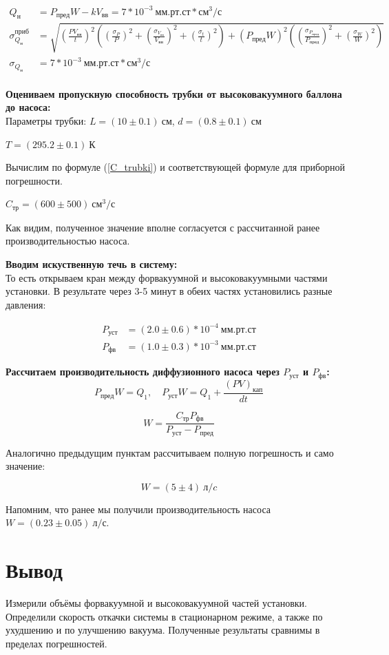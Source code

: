 \documentclass[a4paper, 12pt]{article}
\begin{document}
            \begin{align*}
                Q_н &= P_{пред} W - k V_{вв} = 7 * 10^{-3}~мм.рт.ст*см^3/с\\
                \sigma_{Q_н}^{приб} &= \sqrt{ \left( \frac{P V_{вв}}{t} \right)^2 \left( \left( \frac{\sigma_P}{P} \right)^2 + \left( \frac{\sigma_{V_{вв}}}{V_{вв}} \right)^2 + \left( \frac{\sigma_t}{t} \right)^2 \right) + \left( P_{пред} W \right)^2 \left( \left( \frac{\sigma_{P_{пред}}}{P_{пред}} \right)^2 + \left( \frac{\sigma_W}{W} \right)^2 \right)}\\
                \sigma_{Q_н} &= 7 * 10^{-3}~мм.рт.ст*см^3/с\\
            \end{align*}

        \textbf{Оцениваем пропускную способность трубки от высоковакуумного баллона до насоса:} \\
            Параметры трубки: $L = (10 \pm 0.1)~см$, $d = (0.8 \pm 0.1)~см$

            $T = (295.2 \pm 0.1)~К$

            Вычислим по формуле (\ref{C_trubki}) и соответствующей формуле для приборной погрешности.

            $C_{тр} = (600 \pm 500)~см^3/с$

            Как видим, полученное значение вполне согласуется с рассчитанной ранее производительностью насоса.

        \textbf{Вводим искуственную течь в систему:} \\

            То есть открываем кран между форвакуумной и высоковакуумными частями установки. В результате через 3-5 минут в обеих частях установились разные давления:

            \begin{align*}
                P_{уст} &= (2.0 \pm 0.6)*10^{-4}~мм.рт.ст\\
                P_{фв} &= (1.0 \pm 0.3)*10^{-3}~мм.рт.ст
            \end{align*}

        \textbf{Рассчитаем производительность диффузионного насоса через $P_{уст}$ и $P_{фв}$:} \\
		    $$P_{пред}W = Q_1, \quad P_{уст}W = Q_1 + \frac{(PV)_{кап}}{dt}$$

            $$W = \frac{C_{тр} P_{фв}}{P_{уст} - P_{пред}}$$

            Аналогично предыдущим пунктам рассчитываем полную погрешность и само значение:

            $$W = (5 \pm 4)~л/c$$

            Напомним, что ранее мы получили производительность насоса $W = (0.23 \pm 0.05)~л/с$.

    \section{Вывод}

        Измерили объёмы форвакуумной и высоковакуумной частей установки. Определили скорость откачки системы в стационарном режиме, а также по ухудшению и по улучшению вакуума. Полученные результаты сравнимы в пределах погрешностей.
\end{document}
